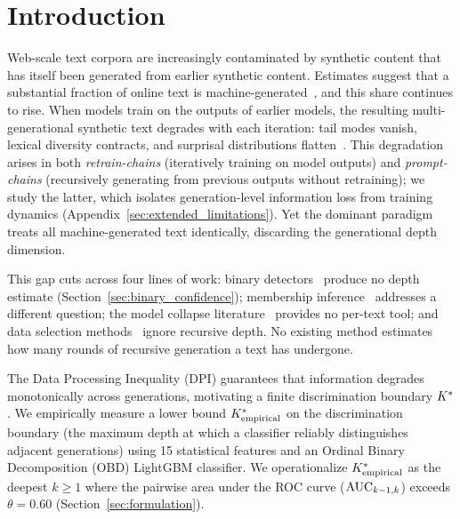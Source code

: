 \section{Introduction}
\label{sec:introduction}

Web-scale text corpora are increasingly contaminated by synthetic content that has itself been generated from earlier synthetic content.
Estimates suggest that a substantial fraction of online text is machine-generated~\cite{sun2025aigt, spennemann2025quantifying}, and this share continues to rise.
When models train on the outputs of earlier models, the resulting multi-generational synthetic text degrades with each iteration: tail modes vanish, lexical diversity contracts, and surprisal distributions flatten~\cite{shumailov2024collapse, dohmatob2024model}.
This degradation arises in both \emph{retrain-chains} (iteratively training on model outputs) and \emph{prompt-chains} (recursively generating from previous outputs without retraining); we study the latter, which isolates generation-level information loss from training dynamics (Appendix~\ref{sec:extended_limitations}).
Yet the dominant paradigm treats all machine-generated text identically, discarding the generational depth dimension.

This gap cuts across four lines of work: binary detectors~\cite{basani2026diveye, zhang2024minkpp} produce no depth estimate (Section~\ref{sec:binary_confidence}); membership inference~\cite{zawalski2026codec} addresses a different question; the model collapse literature~\cite{shumailov2024collapse, alemohammad2024selfconsuming, schaeffer2025position} provides no per-text tool; and data selection methods~\cite{xie2023dsir, tirumala2023d4, drayson2025} ignore recursive depth.
No existing method estimates how many rounds of recursive generation a text has undergone.

The Data Processing Inequality (DPI) guarantees that information degrades monotonically across generations, motivating a finite discrimination boundary ${K^*}$.
We empirically measure a lower bound ${K^*_{\text{empirical}}}$ on the discrimination boundary (the maximum depth at which a classifier reliably distinguishes adjacent generations) using 15 statistical features and an Ordinal Binary Decomposition (OBD) LightGBM classifier.
We operationalize ${K^*_{\text{empirical}}}$ as the deepest $k \geq 1$ where the pairwise area under the ROC curve ($\text{AUC}_{k-1,k}$) exceeds $\theta = 0.60$ (Section~\ref{sec:formulation}).

